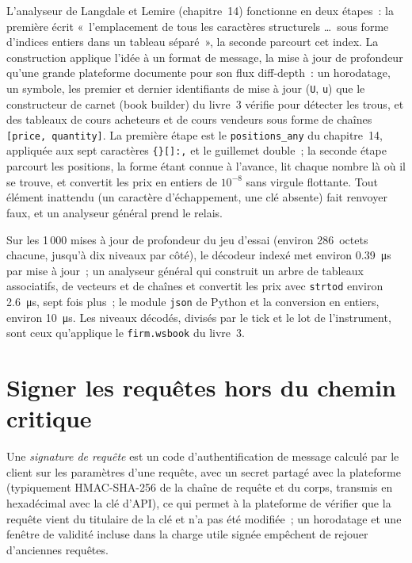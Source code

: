 L'analyseur de Langdale et Lemire (chapitre~14) fonctionne en deux étapes~: la première écrit «~l'emplacement de tous les
caractères structurels \dots\ sous forme d'indices entiers dans un tableau séparé~», la seconde parcourt cet index. La construction applique l'idée à un
format de message, la mise à jour de profondeur qu'une grande plateforme documente pour son flux diff-depth~: un horodatage, un symbole, les premier et dernier
identifiants de mise à jour (\texttt{U}, \texttt{u}) que le constructeur de carnet (book builder) du livre~3 vérifie pour détecter les trous, et des tableaux de cours acheteurs et de cours vendeurs sous forme de
chaînes \texttt{[price, quantity]}. La première étape est le \texttt{positions\_any} du chapitre~14, appliquée aux sept caractères
\texttt{\{\}[]:,} et le guillemet double~; la seconde étape parcourt les positions, la forme étant connue à l'avance, lit chaque nombre là où il se trouve, et
convertit les prix en entiers de $10^{-8}$ sans virgule flottante. Tout élément inattendu (un caractère d'échappement, une clé absente) fait
renvoyer faux, et un analyseur général prend le relais.

\label{lst:ll:websocket-rest-tls-and-json-at-speed:walk}

Sur les 1\,000 mises à jour de profondeur du jeu d'essai (environ 286~octets chacune, jusqu'à dix niveaux par côté), le décodeur indexé met environ
\qty{0.39}{\micro\second} par mise à jour~; un analyseur général qui construit un arbre de tableaux associatifs, de vecteurs et de chaînes et convertit les prix
avec \texttt{strtod} environ \qty{2.6}{\micro\second}, sept fois plus~; le module \texttt{json} de Python et la conversion en
entiers, environ \qty{10}{\micro\second}. Les niveaux décodés, divisés par le tick et le lot de l'instrument, sont ceux qu'applique le
\texttt{firm.wsbook} du livre~3.

\section{Signer les requêtes hors du chemin critique}

\begin{definition}\label{def:ll:websocket-rest-tls-and-json-at-speed:signature}
Une \emph{signature de requête} est un code d'authentification de message calculé par le client sur les paramètres d'une requête, avec un secret
partagé avec la plateforme (typiquement HMAC-SHA-256 de la chaîne de requête et du corps, transmis en hexadécimal avec la clé d'API), ce qui permet
à la plateforme de vérifier que la requête vient du titulaire de la clé et n'a pas été modifiée~; un horodatage et une fenêtre de validité incluse dans la
charge utile signée empêchent de rejouer d'anciennes requêtes.
\end{definition}

